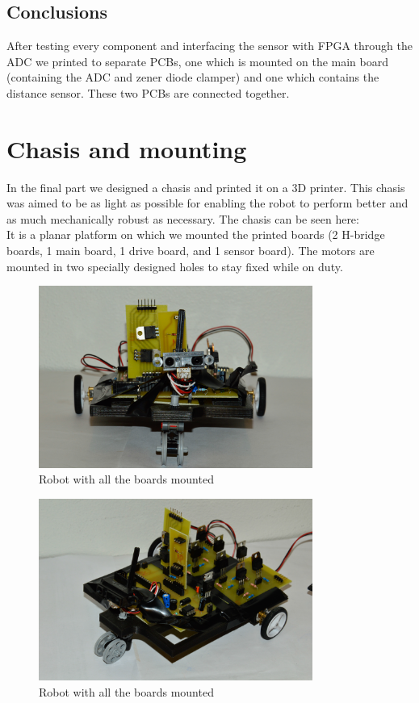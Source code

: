 \newpage
\section{Conclusions}
After testing every component and interfacing the sensor with FPGA through the ADC we printed to separate PCBs, one which is mounted on the main board (containing the ADC and zener diode clamper) and one which contains the distance sensor. These two PCBs are connected together. 

\chapter{Chasis and mounting}
\label{chap:Chassis}

In the final part we designed a chasis and printed it on a 3D printer. This chasis
was aimed to be as light as possible for enabling the robot to perform better and as much mechanically robust as necessary. The chasis can be seen here:
\\It is a planar platform on which we mounted the printed boards (2 H-bridge boards, 1 main board, 1 drive board, and 1 sensor board). The motors are mounted in two specially designed holes to stay fixed while on duty. 

\begin{figure}[!ht]
	\centering
	\includegraphics[width=0.8\textwidth]{figures/printcar}
	\caption{Robot with all the boards mounted}
	\label{fig:car1}
\end{figure}

\begin{figure}[!ht]
	\centering
	\includegraphics[width=0.8\textwidth]{figures/printcar2}
	\caption{Robot with all the boards mounted}
	\label{fig:car2}
\end{figure}


